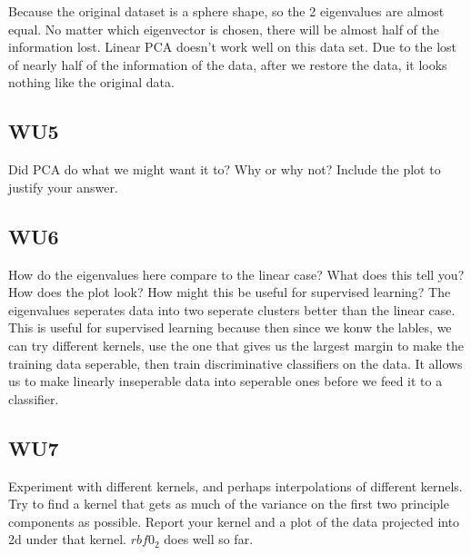 \documentclass[a4paper,11pt]{article}
\begin{document}
Because the original dataset is a sphere shape, so the 2 eigenvalues are
almost equal.  No matter which eigenvector is chosen, there will be almost
half of the information lost. Linear PCA doesn't work well on this data set.
Due to the lost of nearly half of the information of the data, after we
restore the data, it looks nothing like the original data.

\subsection{WU5}
\textsf{Did PCA do what we might want it to? Why or why not? Include
the plot to justify your answer.}\vspace{0.1in}


\subsection{WU6}
\textsf{How do the eigenvalues here compare to the linear case? What
does this tell you? How does the plot look? How might this be useful
for supervised learning?}\vspace{0.1in}
The eigenvalues seperates data into two
seperate clusters better than the linear case. This is useful for
supervised learning because then since we konw the lables, we can try
different kernels, use the one that gives us the largest margin to
make the training data seperable, then train discriminative
classifiers on the data. It allows us to make linearly inseperable
data into seperable ones before we feed it to a classifier.

\subsection{WU7}
\textsf{Experiment with different kernels, and perhaps interpolations 
of different kernels. Try to find a kernel that gets as much of the 
variance on the first two principle components as possible. Report your 
kernel and a plot of the data projected into 2d under that kernel.}\vspace{0.1in}
$rbf0_2$ does well so far.
\pagebreak
\end{document}
